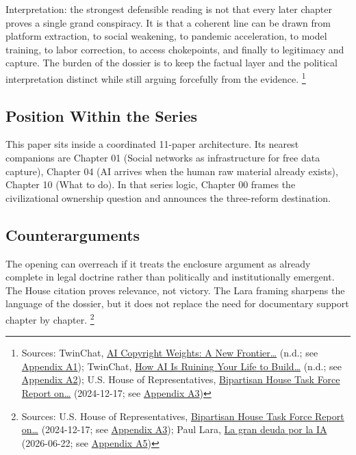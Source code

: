 \documentclass[
  american,
  11pt,
  letterpaper,
]{article}
\begin{document}
Interpretation: the strongest defensible reading is not that every later
chapter proves a single grand conspiracy. It is that a coherent line can
be drawn from platform extraction, to social weakening, to pandemic
acceleration, to model training, to labor correction, to access
chokepoints, and finally to legitimacy and capture. The burden of the
dossier is to keep the factual layer and the political interpretation
distinct while still arguing forcefully from the evidence. \footnote{Sources:
  TwinChat,
  \href{https://medium.com/twinchat/ai-copyright-weights-a-new-frontier-in-intellectual-property-law-d8ee1b6c55ee}{AI
  Copyright Weights: A New Frontier\ldots{}} (n.d.; see
  \hyperref[ch-00-appendix-a1-ai-copyright-weights-a-new-frontier-in-intellectual-property-law]{Appendix
  A1}); TwinChat,
  \href{https://medium.com/twinchat/how-ai-is-ruining-your-life-to-build-an-empire-8b6d02e55bc9}{How
  AI Is Ruining Your Life to Build\ldots{}} (n.d.; see
  \hyperref[ch-00-appendix-a2-how-ai-is-ruining-your-life-to-build-an-empire]{Appendix
  A2}); U.S. House of Representatives,
  \href{https://www.speaker.gov/wp-content/uploads/2024/12/AI-Task-Force-Report-FINAL.pdf}{Bipartisan
  House Task Force Report on\ldots{}} (2024-12-17; see
  \hyperref[ch-00-appendix-a3-bipartisan-house-task-force-report-on-artificial-intelligence]{Appendix
  A3})}

\subsection{Position Within the
Series}\label{position-within-the-series}

This paper sits inside a coordinated 11-paper architecture. Its nearest
companions are Chapter 01 (Social networks as infrastructure for free
data capture), Chapter 04 (AI arrives when the human raw material
already exists), Chapter 10 (What to do). In that series logic, Chapter
00 frames the civilizational ownership question and announces the
three-reform destination.

\subsection{Counterarguments}\label{counterarguments}

The opening can overreach if it treats the enclosure argument as already
complete in legal doctrine rather than politically and institutionally
emergent. The House citation proves relevance, not victory. The Lara
framing sharpens the language of the dossier, but it does not replace
the need for documentary support chapter by chapter. \footnote{Sources:
  U.S. House of Representatives,
  \href{https://www.speaker.gov/wp-content/uploads/2024/12/AI-Task-Force-Report-FINAL.pdf}{Bipartisan
  House Task Force Report on\ldots{}} (2024-12-17; see
  \hyperref[ch-00-appendix-a3-bipartisan-house-task-force-report-on-artificial-intelligence]{Appendix
  A3}); Paul Lara,
  \href{https://www.dineroenimagen.com/paul-lara/la-gran-deuda-por-la-ia/186930}{La
  gran deuda por la IA} (2026-06-22; see
  \hyperref[ch-00-appendix-a5-la-gran-deuda-por-la-ia]{Appendix A5})}
\end{document}
